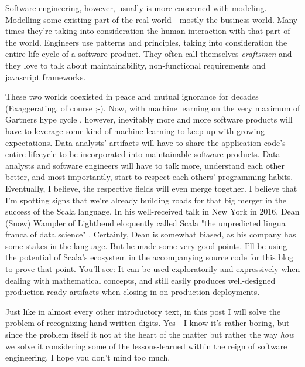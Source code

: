 \documentclass[]{report}
\begin{document}
Software engineering, however, usually is more concerned with modeling. Modelling some existing part of the real world - mostly the business world. Many times they're taking into consideration the human interaction with that part of the world. Engineers use patterns and principles, taking into consideration the entire life cycle of a software product. They often call themselves \emph{craftsmen} and they love to talk about maintainability, non-functional requirements and javascript frameworks.

\bigskip

These two worlds coexisted in peace and mutual ignorance for decades (Exaggerating, of course ;-). Now, with machine learning on the very maximum of Gartners hype cycle \cite{gartner2017}, however, inevitably more and more software products will have to leverage some kind of machine learning to keep up with growing expectations. Data analysts' artifacts will have to share the application code's entire lifecycle to be incorporated into maintainable software products. Data analysts and software engineers will have to talk more, understand each other better, and most importantly, start to respect each others' programming habits. Eventually, I believe, the respective fields will even merge together. I believe that I'm spotting signs that we're already building roads for that big merger in the success of the Scala language. In his well-received talk in New York in 2016, Dean (Snow) Wampler of Lightbend eloquently called Scala "the unpredicted lingua franca of data science" \cite{wampler2016}. Certainly, Dean is somewhat biased, as his company has some stakes in the language. But he made some very good points. I'll be using the potential of Scala's ecosystem in the accompanying source code for this blog to prove that point. You'll see: It can be used exploratorily and expressively when dealing with mathematical concepts, and still easily produces well-designed production-ready artifacts when closing in on production deployments.

\bigskip

Just like in almost every other introductory text, in this post I will solve the problem of recognizing hand-written digits. Yes - I know it's rather boring, but since the problem itself it not at the heart of the matter but rather the way \emph{how} we solve it considering some of the lessons-learned within the reign of software engineering, I hope you don't mind too much.
\end{document}
